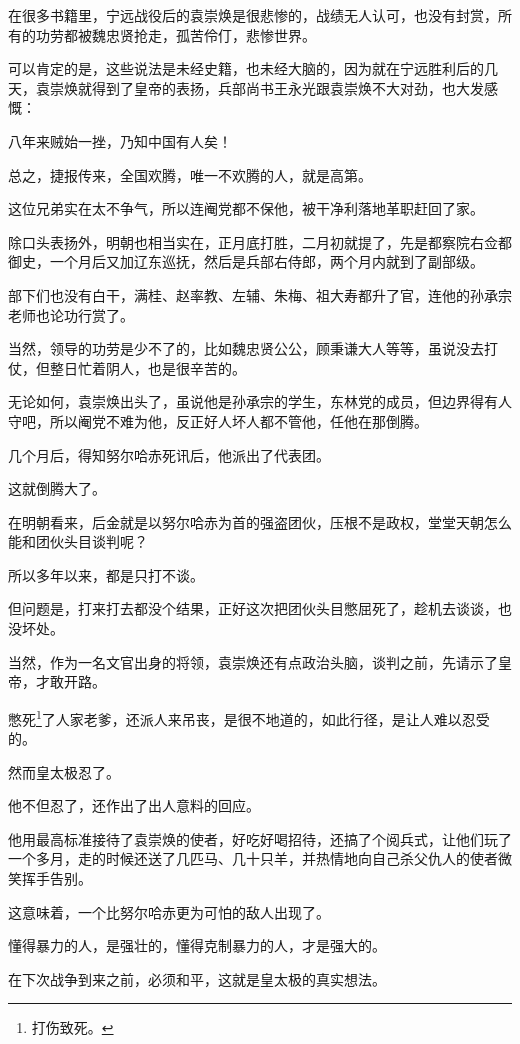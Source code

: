 \begin{multicols}{\theparacolNo}
		在很多书籍里，宁远战役后的袁崇焕是很悲惨的，战绩无人认可，也没有封赏，所有的功劳都被魏忠贤抢走，孤苦伶仃，悲惨世界。

		可以肯定的是，这些说法是未经史籍，也未经大脑的，因为就在宁远胜利后的几天，袁崇焕就得到了皇帝的表扬，兵部尚书王永光跟袁崇焕不大对劲，也大发感慨：

		八年来贼始一挫，乃知中国有人矣！

		总之，捷报传来，全国欢腾，唯一不欢腾的人，就是高第。

		这位兄弟实在太不争气，所以连阉党都不保他，被干净利落地革职赶回了家。

		除口头表扬外，明朝也相当实在，正月底打胜，二月初就提了，先是都察院右佥都御史，一个月后又加辽东巡抚，然后是兵部右侍郎，两个月内就到了副部级。

		部下们也没有白干，满桂、赵率教、左辅、朱梅、祖大寿都升了官，连他的孙承宗老师也论功行赏了。

		当然，领导的功劳是少不了的，比如魏忠贤公公，顾秉谦大人等等，虽说没去打仗，但整日忙着阴人，也是很辛苦的。

		无论如何，袁崇焕出头了，虽说他是孙承宗的学生，东林党的成员，但边界得有人守吧，所以阉党不难为他，反正好人坏人都不管他，任他在那倒腾。

		几个月后，得知努尔哈赤死讯后，他派出了代表团。

		这就倒腾大了。

		在明朝看来，后金就是以努尔哈赤为首的强盗团伙，压根不是政权，堂堂天朝怎么能和团伙头目谈判呢？

		所以多年以来，都是只打不谈。

		但问题是，打来打去都没个结果，正好这次把团伙头目憋屈死了，趁机去谈谈，也没坏处。

		当然，作为一名文官出身的将领，袁崇焕还有点政治头脑，谈判之前，先请示了皇帝，才敢开路。

		憋死\footnote{打伤致死。}了人家老爹，还派人来吊丧，是很不地道的，如此行径，是让人难以忍受的。

		然而皇太极忍了。

		他不但忍了，还作出了出人意料的回应。

		他用最高标准接待了袁崇焕的使者，好吃好喝招待，还搞了个阅兵式，让他们玩了一个多月，走的时候还送了几匹马、几十只羊，并热情地向自己杀父仇人的使者微笑挥手告别。

		这意味着，一个比努尔哈赤更为可怕的敌人出现了。

		懂得暴力的人，是强壮的，懂得克制暴力的人，才是强大的。

		在下次战争到来之前，必须和平，这就是皇太极的真实想法。


\end{multicols}
